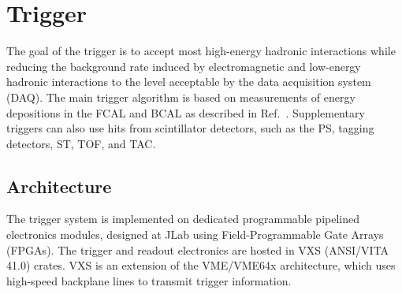 
\section[Trigger]{Trigger \label{sec:trig}}
The goal of the \gx{} trigger is to accept most high-energy hadronic interactions while reducing the background rate induced by electromagnetic and low-energy hadronic interactions to the level acceptable 
by the data acquisition system (DAQ).  The main trigger algorithm is based on measurements of energy depositions in the FCAL and BCAL as described in Ref.~\cite{somov_l1,somov_l11}. Supplementary triggers can also use hits from scintillator detectors, such as the PS, tagging detectors, ST, TOF, and TAC.

\subsection{Architecture \label{sec:trigarchitecture}}
The \gx{} trigger system\cite{GlueX:2013twa} is implemented on dedicated programmable pipelined electronics modules, designed at JLab using Field-Programmable Gate Arrays (FPGAs).  The \gx{} trigger and readout electronics are hosted in VXS (ANSI/VITA 41.0) crates. VXS is an extension of the VME/VME64x architecture, which uses high-speed backplane lines to transmit trigger information. 

